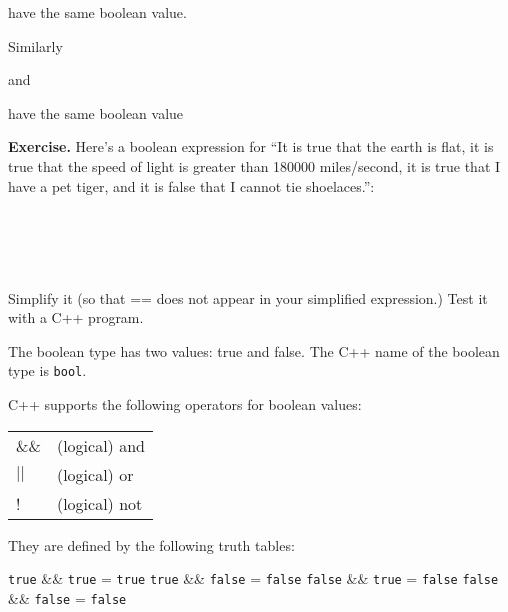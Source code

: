 {{{{{

have the same boolean value.

Similarly


and


have the same boolean value

\textbf{Exercise.} Here's a boolean expression for “It is true that the earth is flat, it is true that the speed of light is greater than 180000 miles/second, it is true that I have a pet tiger, and it is false that I cannot tie shoelaces.”:


\\
\\
\\
\\


Simplify it (so that == does not appear in your simplified expression.)
Test it with a C++ program.

\newpage{}

The boolean type has two values: true and false. The C++ name of the boolean type is \verb!bool!.

C++ supports the following operators for boolean values:

\begin{tabular}{p{1cm} p{3cm}}
  \&\& & (logical) and\\
  $||$ & (logical) or\\
  ! & (logical) not\\
\end{tabular}
  
They are defined by the following truth tables:



\begin{center}
\verb!true! \&\& \verb!true!  = \verb!true!
\verb!true! \&\& \verb!false!  = \verb!false!
\verb!false! \&\& \verb!true!  = \verb!false!
\verb!false! \&\& \verb!false!  = \verb!false!


\end{center}}}}}}
